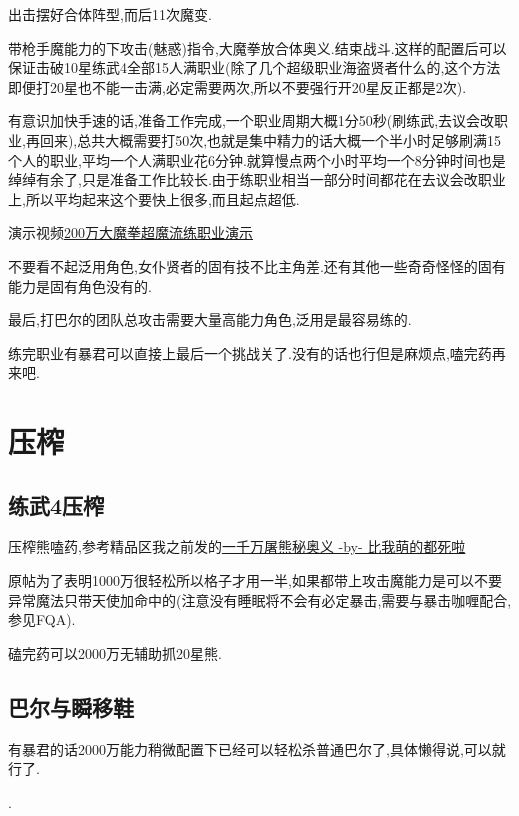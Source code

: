		出击摆好合体阵型,而后11次魔变.

		带枪手魔能力的下攻击(魅惑)指令,大魔拳放合体奥义.结束战斗.这样的配置后可以保证击破10星练武4全部15人满职业(除了几个超级职业海盗贤者什么的,这个方法即便打20星也不能一击满,必定需要两次,所以不要强行开20星反正都是2次).

		有意识加快手速的话,准备工作完成,一个职业周期大概1分50秒(刷练武,去议会改职业,再回来),总共大概需要打50次,也就是集中精力的话大概一个半小时足够刷满15个人的职业,平均一个人满职业花6分钟.就算慢点两个小时平均一个8分钟时间也是绰绰有余了,只是准备工作比较长.由于练职业相当一部分时间都花在去议会改职业上,所以平均起来这个要快上很多,而且起点超低.

		演示视频\href{http://www.bilibili.com/video/av2966618/}{200万大魔拳超魔流练职业演示}

		不要看不起泛用角色,女仆贤者的固有技不比主角差.还有其他一些奇奇怪怪的固有能力是固有角色没有的.

		最后,打巴尔的团队总攻击需要大量高能力角色,泛用是最容易练的.

		练完职业有暴君可以直接上最后一个挑战关了.没有的话也行但是麻烦点,嗑完药再来吧.

	\newpage

	\section{压榨}

		\subsection{练武4压榨}

		压榨熊嗑药,参考精品区我之前发的\href{http://tieba.baidu.com/p/3825275063}{一千万屠熊秘奥义 -by- 比我萌的都死啦}

		原帖为了表明1000万很轻松所以格子才用一半,如果都带上攻击魔能力是可以不要异常魔法只带天使加命中的(注意没有睡眠将不会有必定暴击,需要与暴击咖喱配合,参见FQA).

		磕完药可以2000万无辅助抓20星熊.

		\subsection{巴尔与瞬移鞋}

		有暴君的话2000万能力稍微配置下已经可以轻松杀普通巴尔了,具体懒得说,可以就行了.

		{\color{red}{即便没有这里也建议用2000万能力挑战下,整个游戏挑战关已经没几个了,如果觉得困难可以参考后面修罗篇的巴尔攻略}}.

